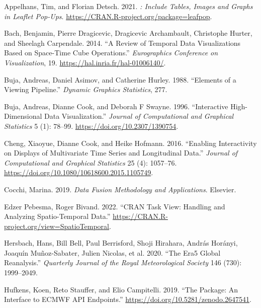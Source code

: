 \documentclass{article}
\newlength{\cslhangindent}
\newlength{\cslentryspacingunit} %
\newenvironment{CSLReferences}[2] %
 {%
  \setlength{\parindent}{0pt}
  \ifodd #1
  \let\oldpar\par
  \def\par{\hangindent=\cslhangindent\oldpar}
  \fi
  \setlength{\parskip}{#2\cslentryspacingunit}
 }%
 {}
\begin{document}
\hypertarget{refs}{}
\begin{CSLReferences}{1}{0}
\leavevmode{}%
Appelhans, Tim, and Florian Detsch. 2021. \emph{: Include Tables, Images and Graphs in Leaflet Pop-Ups}. \url{https://CRAN.R-project.org/package=leafpop}.

\leavevmode{}%
Bach, Benjamin, Pierre Dragicevic, Dragicevic Archambault, Christophe Hurter, and Sheelagh Carpendale. 2014. {``A {Review} of {Temporal} {Data} {Visualizations} {Based} on {Space}-{Time} {Cube} {Operations}.''} \emph{Eurographics Conference on Visualization}, 19. \url{https://hal.inria.fr/hal-01006140/}.

\leavevmode{}%
Buja, Andreas, Daniel Asimov, and Catherine Hurley. 1988. {``Elements of a Viewing Pipeline.''} \emph{Dynamic Graphics Statistics}, 277.

\leavevmode{}%
Buja, Andreas, Dianne Cook, and Deborah F Swayne. 1996. {``Interactive High-Dimensional Data Visualization.''} \emph{Journal of Computational and Graphical Statistics} 5 (1): 78--99. \url{https://doi.org/10.2307/1390754}.

\leavevmode{}%
Cheng, Xiaoyue, Dianne Cook, and Heike Hofmann. 2016. {``Enabling Interactivity on Displays of Multivariate Time Series and Longitudinal Data.''} \emph{Journal of Computational and Graphical Statistics} 25 (4): 1057--76. \url{https://doi.org/10.1080/10618600.2015.1105749}.

\leavevmode{}%
Cocchi, Marina. 2019. \emph{Data Fusion Methodology and Applications}. Elsevier.

\leavevmode{}%
Edzer Pebesma, Roger Bivand. 2022. {``{CRAN} Task View: Handling and Analyzing Spatio-Temporal Data.''} \url{https://CRAN.R-project.org/view=SpatioTemporal}.

\leavevmode{}%
Hersbach, Hans, Bill Bell, Paul Berrisford, Shoji Hirahara, András Horányi, Joaquín Muñoz-Sabater, Julien Nicolas, et al. 2020. {``The Era5 Global Reanalysis.''} \emph{Quarterly Journal of the Royal Meteorological Society} 146 (730): 1999--2049.

\leavevmode{}%
Hufkens, Koen, Reto Stauffer, and Elio Campitelli. 2019. {``The  Package: An Interface to ECMWF API Endpoints.''} \url{https://doi.org/10.5281/zenodo.2647541}.


\end{CSLReferences}
\end{document}
